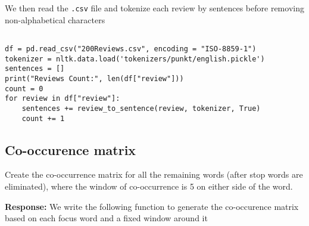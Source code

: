 \documentclass[12pt, letterpaper]{article}
\newcommand{\mybox}[1]{\par\noindent\colorbox{shadecolor}
{\parbox{\dimexpr\textwidth-2\fboxsep\relax}{#1}}}
\begin{document}
We then read the \texttt{.csv} file and tokenize each review by sentences before removing non-alphabetical characters

\begin{mdframed}[backgroundcolor=shadecolor]
\begin{verbatim}

df = pd.read_csv("200Reviews.csv", encoding = "ISO-8859-1")
tokenizer = nltk.data.load('tokenizers/punkt/english.pickle')
sentences = []
print("Reviews Count:", len(df["review"]))
count = 0
for review in df["review"]:
    sentences += review_to_sentence(review, tokenizer, True)
    count += 1

\end{verbatim}
\end{mdframed}

\subsection{Co-occurence matrix}
\mybox{Create the co-occurrence matrix for all the remaining words (after stop words are eliminated), where the window of co-occurrence is 5 on either side of the word.}

\textbf{Response:} We write the following function to generate the co-occurence matrix based on each focus word and a fixed window around it
\end{document}
